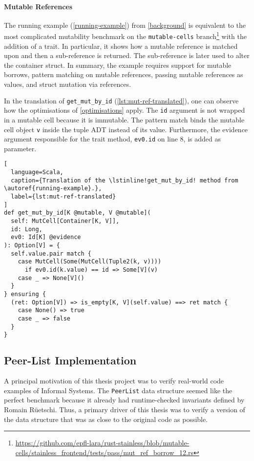 \paragraph{Mutable References}

The running example (\autoref{running-example}) from \autoref{background} is
equivalent to the most complicated mutability benchmark on the
\texttt{mutable-cells}
branch\footnote{\url{https://github.com/epfl-lara/rust-stainless/blob/mutable-cells/stainless_frontend/tests/pass/mut_ref_borrow_12.rs}}
with the addition of a trait. In particular, it shows how a mutable reference is
matched upon and then a sub-reference is returned. The sub-reference is later
used to alter the container struct. In summary, the example requires support for
mutable borrows, pattern matching on mutable references, passing mutable
references as values, and struct mutation via references.

In the translation of \lstinline!get_mut_by_id!
(\autoref{lst:mut-ref-translated}), one can observe how the optimisations of
\autoref{optimisations} apply. The \lstinline!id! argument is not wrapped in a
mutable cell because it is immutable. The pattern match binds the mutable cell
object \lstinline!v! inside the tuple ADT instead of its value. Furthermore, the
evidence argument responsible for the trait method, \lstinline!ev0.id! on line
8, is added as parameter.

\begin{lstlisting}[
  language=Scala,
  caption={Translation of the \lstinline!get_mut_by_id! method from \autoref{running-example}.},
  label={lst:mut-ref-translated}
]
def get_mut_by_id[K @mutable, V @mutable](
  self: MutCell[Container[K, V]],
  id: Long,
  ev0: Id[K] @evidence
): Option[V] = {
  self.value.pair match {
    case MutCell(Some(MutCell(Tuple2(k, v))))
      if ev0.id(k.value) == id => Some[V](v)
    case _ => None[V]()
  }
} ensuring {
  (ret: Option[V]) => is_empty[K, V](self.value) ==> ret match {
    case None() => true
    case _ => false
  }
}
\end{lstlisting}

\subsection{Peer-List Implementation}
\label{peerlist}

A principal motivation of this thesis project was to verify real-world code
examples of Informal Systems. The \lstinline!PeerList! data structure seemed
like the perfect benchmark because it already had runtime-checked invariants
defined by Romain Rüetschi. Thus, a primary driver of this thesis was to verify
a version of the data structure that was as close to the original code as
possible.

